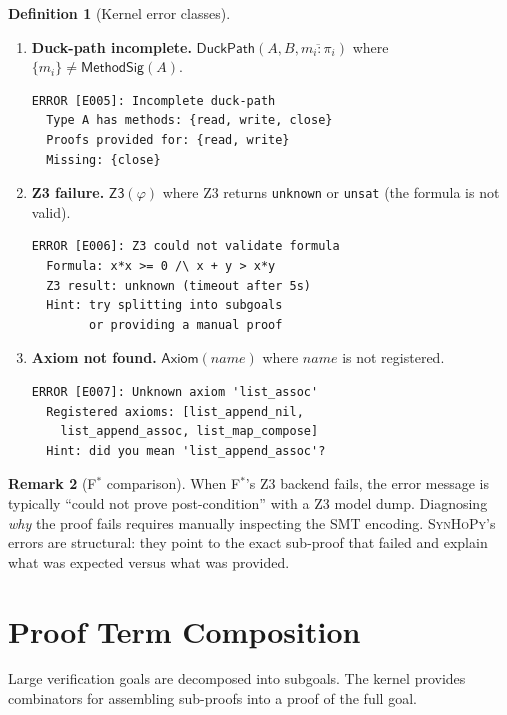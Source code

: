 \documentclass[11pt,a4paper]{report}
\theoremstyle{definition}
\newtheorem{definition}{Definition}[chapter]
\newtheorem{remark}[definition]{Remark}
\theoremstyle{plain}
\newcommand{\MethodSig}{\mathsf{MethodSig}}
\newcommand{\fstar}{F$^{*}$}
\newcommand{\synhopy}{\textsc{SynHoPy}}
\begin{document}
\begin{definition}[Kernel error classes]
\begin{enumerate}
  \item \textbf{Duck-path incomplete.}
    $\mathsf{DuckPath}(A, B, \overline{m_i : \pi_i})$ where
    $\{m_i\} \neq \MethodSig(A)$.
\begin{lstlisting}[style=proof]
ERROR [E005]: Incomplete duck-path
  Type A has methods: {read, write, close}
  Proofs provided for: {read, write}
  Missing: {close}
\end{lstlisting}

  \item \textbf{Z3 failure.}
    $\mathsf{Z3}(\varphi)$ where Z3 returns \texttt{unknown} or
    \texttt{unsat} (the formula is not valid).
\begin{lstlisting}[style=proof]
ERROR [E006]: Z3 could not validate formula
  Formula: x*x >= 0 /\ x + y > x*y
  Z3 result: unknown (timeout after 5s)
  Hint: try splitting into subgoals
        or providing a manual proof
\end{lstlisting}

  \item \textbf{Axiom not found.}
    $\mathsf{Axiom}(\mathit{name})$ where $\mathit{name}$ is not
    registered.
\begin{lstlisting}[style=proof]
ERROR [E007]: Unknown axiom 'list_assoc'
  Registered axioms: [list_append_nil,
    list_append_assoc, list_map_compose]
  Hint: did you mean 'list_append_assoc'?
\end{lstlisting}
\end{enumerate}
\end{definition}

\begin{remark}[\fstar{} comparison]
When \fstar{}'s Z3 backend fails, the error message is typically
``could not prove post-condition'' with a Z3 model dump. Diagnosing
\emph{why} the proof fails requires manually inspecting the SMT
encoding. \synhopy{}'s errors are structural: they point to the
exact sub-proof that failed and explain what was expected versus what
was provided.
\end{remark}


\section{Proof Term Composition}
\label{sec:composition}

Large verification goals are decomposed into subgoals. The kernel
provides combinators for assembling sub-proofs into a proof of the
full goal.
\end{document}
